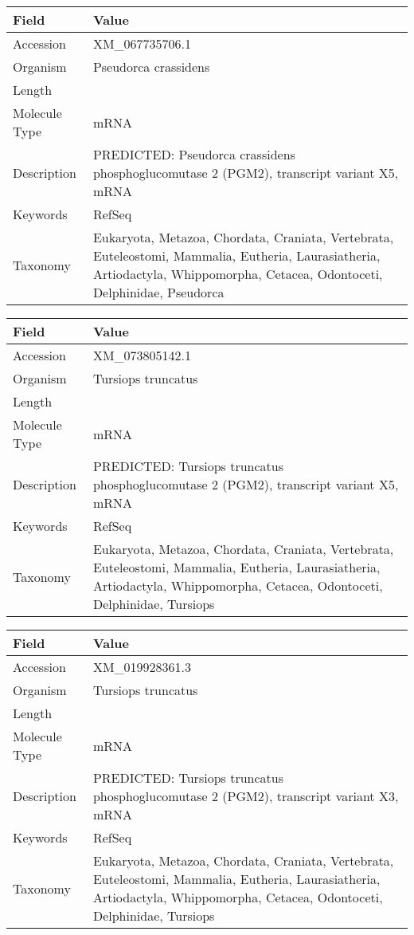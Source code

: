 \documentclass[10pt]{article}
\begin{document}
{\footnotesize
\begin{longtable}{>{\raggedright\arraybackslash}p{4.5cm} >{\raggedright\arraybackslash}p{11.5cm}}
\textbf{Field} & \textbf{Value} \\
\hline
Accession & XM\_067735706.1 \\
Organism & Pseudorca crassidens \\
Length & 12568 \\
Molecule Type & mRNA \\
Description & PREDICTED: Pseudorca crassidens phosphoglucomutase 2 (PGM2), transcript variant X5, mRNA \\
Keywords & RefSeq \\
Taxonomy & Eukaryota, Metazoa, Chordata, Craniata, Vertebrata, Euteleostomi, Mammalia, Eutheria, Laurasiatheria, Artiodactyla, Whippomorpha, Cetacea, Odontoceti, Delphinidae, Pseudorca \\
\end{longtable}
}

{\footnotesize
\begin{longtable}{>{\raggedright\arraybackslash}p{4.5cm} >{\raggedright\arraybackslash}p{11.5cm}}
\textbf{Field} & \textbf{Value} \\
\hline
Accession & XM\_073805142.1 \\
Organism & Tursiops truncatus \\
Length & 3301 \\
Molecule Type & mRNA \\
Description & PREDICTED: Tursiops truncatus phosphoglucomutase 2 (PGM2), transcript variant X5, mRNA \\
Keywords & RefSeq \\
Taxonomy & Eukaryota, Metazoa, Chordata, Craniata, Vertebrata, Euteleostomi, Mammalia, Eutheria, Laurasiatheria, Artiodactyla, Whippomorpha, Cetacea, Odontoceti, Delphinidae, Tursiops \\
\end{longtable}
}

{\footnotesize
\begin{longtable}{>{\raggedright\arraybackslash}p{4.5cm} >{\raggedright\arraybackslash}p{11.5cm}}
\textbf{Field} & \textbf{Value} \\
\hline
Accession & XM\_019928361.3 \\
Organism & Tursiops truncatus \\
Length & 3329 \\
Molecule Type & mRNA \\
Description & PREDICTED: Tursiops truncatus phosphoglucomutase 2 (PGM2), transcript variant X3, mRNA \\
Keywords & RefSeq \\
Taxonomy & Eukaryota, Metazoa, Chordata, Craniata, Vertebrata, Euteleostomi, Mammalia, Eutheria, Laurasiatheria, Artiodactyla, Whippomorpha, Cetacea, Odontoceti, Delphinidae, Tursiops \\
\end{longtable}
}
\end{document}
